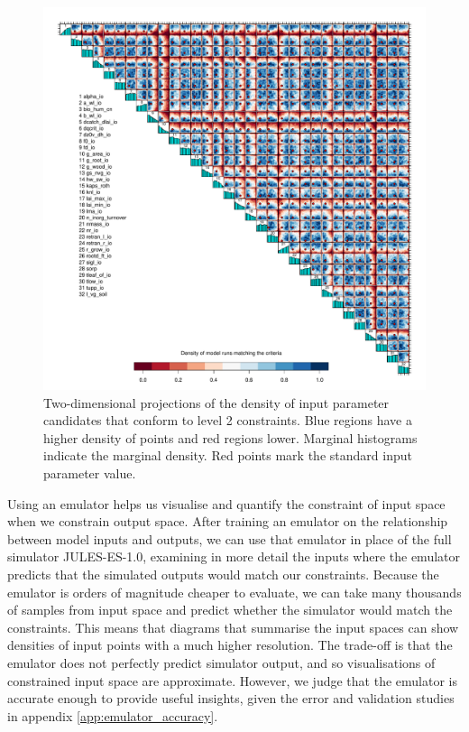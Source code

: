 \documentclass[gmd, manuscript]{copernicus}
\begin{document}
\begin{figure}[t]
\includegraphics[width=12cm]{./figs/fig08.pdf}
\caption{Two-dimensional projections of the density of input parameter candidates that conform to level 2 constraints. Blue regions have a higher density of points and red regions lower. Marginal histograms indicate the marginal density. Red points mark the standard input parameter value.}
\label{fig:pairs_level2_ix_em_unif_wave00_wave01}
\end{figure}

Using an emulator helps us visualise and quantify the constraint of input space when we constrain output space. After training an emulator on the relationship between model inputs and outputs, we can use that emulator in place of the full simulator JULES-ES-1.0, examining in more detail the inputs where the emulator predicts that the simulated outputs would match our constraints. Because the emulator is orders of magnitude cheaper to evaluate, we can take many thousands of samples from input space and predict whether the simulator would match the constraints. This means that diagrams that summarise the input spaces can show densities of input points with a much higher resolution. The trade-off is that the emulator does not perfectly predict simulator output, and so visualisations of constrained input space are approximate. However, we judge that the emulator is accurate enough to provide useful insights, given the error and validation studies in appendix \ref{app:emulator_accuracy}.
\end{document}
